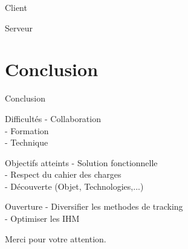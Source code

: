 \documentclass{beamer}
\begin{document}
		\begin{frame}{Client}
		\end{frame}
		\begin{frame}{Serveur}
		\end{frame}

	\section{Conclusion}
		\begin{frame}{Conclusion}
			\begin{alertblock}{Difficultés}
				- Collaboration \\
				- Formation \\
				- Technique 
			\end{alertblock}
			\pause
			\begin{exampleblock}{Objectifs atteints}
				- Solution fonctionnelle \\
				- Respect du cahier des charges \\
				- Découverte (Objet, Technologies,...) 
			\end{exampleblock}
			\pause
			\begin{block}{Ouverture}
				- Diversifier les methodes de tracking\\
				- Optimiser les IHM \\
			\end{block}
		\end{frame}
	
	\begin{frame}
		\begin{center}
			\huge{Merci pour votre attention.} \\
		\end{center}
	\end{frame}
\end{document}
